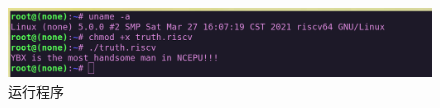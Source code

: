 \begin{figure}[htbp]
  \centering %
  \includegraphics[width=0.9 \textwidth]{figs/Process/run_truth.png}
  \caption{运行程序}
  \label{fig:run_truth} %
\end{figure}








